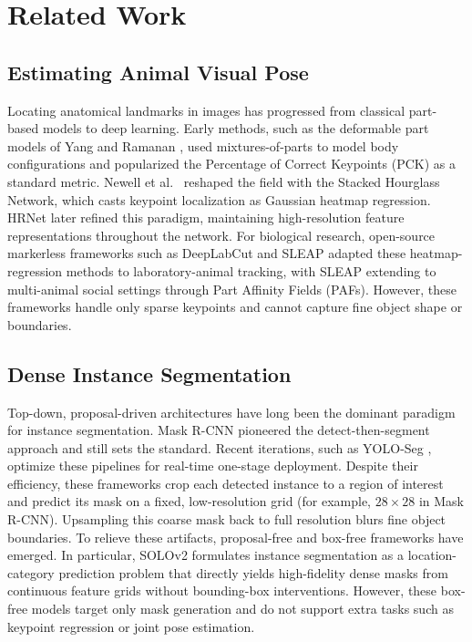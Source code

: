 \documentclass[runningheads]{llncs}
\begin{document}
\section{Related Work}

\subsection{Estimating Animal Visual Pose}
Locating anatomical landmarks in images has progressed from classical part-based models to deep learning. Early methods, such as the deformable part models of Yang and Ramanan \cite{yang2011pck}, used mixtures-of-parts to model body configurations and popularized the Percentage of Correct Keypoints (PCK) as a standard metric. Newell et al.\ \cite{newell2016stacked} reshaped the field with the Stacked Hourglass Network, which casts keypoint localization as Gaussian heatmap regression. HRNet \cite{sun2019hrnet} later refined this paradigm, maintaining high-resolution feature representations throughout the network. For biological research, open-source markerless frameworks such as DeepLabCut \cite{mathis2018deeplabcut} and SLEAP \cite{pereira2022sleap} adapted these heatmap-regression methods to laboratory-animal tracking, with SLEAP extending to multi-animal social settings through Part Affinity Fields (PAFs). However, these frameworks handle only sparse keypoints and cannot capture fine object shape or boundaries.

\subsection{Dense Instance Segmentation}
Top-down, proposal-driven architectures have long been the dominant paradigm for instance segmentation. Mask R-CNN \cite{he2017maskrcnn} pioneered the detect-then-segment approach and still sets the standard. Recent iterations, such as YOLO-Seg \cite{jocher2026yolo26}, optimize these pipelines for real-time one-stage deployment. Despite their efficiency, these frameworks crop each detected instance to a region of interest and predict its mask on a fixed, low-resolution grid (for example, $28\times28$ in Mask R-CNN). Upsampling this coarse mask back to full resolution blurs fine object boundaries. To relieve these artifacts, proposal-free and box-free frameworks have emerged. In particular, SOLOv2 \cite{wang2020solov2} formulates instance segmentation as a location-category prediction problem that directly yields high-fidelity dense masks from continuous feature grids without bounding-box interventions. However, these box-free models target only mask generation and do not support extra tasks such as keypoint regression or joint pose estimation.
\end{document}
